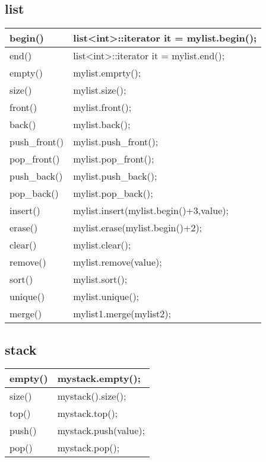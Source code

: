 \documentclass{article}
\begin{document}
	\subsection{list}
	\begin{table}[h]
		\centering
		\begin{tabular}{|p{3cm}|p{10cm}|}
			\hline
			begin() & list<int>::iterator it = mylist.begin();\\
			\hline
			end() &  list<int>::iterator it = mylist.end(); \\
			\hline
			empty() & mylist.emprty(); \\
			\hline
			size() & mylist.size(); \\
			\hline
			front() & mylist.front();\\
			\hline
			back() & mylist.back();\\
			\hline
			push\_front() & mylist.push\_front();\\
			\hline
			pop\_front() & mylist.pop\_front();\\
			\hline
			push\_back() & mylist.push\_back();\\
			\hline
			pop\_back() & mylist.pop\_back();\\
			\hline
			insert() & mylist.insert(mylist.begin()+3,value);\\
			\hline
			erase() & mylist.erase(mylist.begin()+2);\\
			\hline
			clear() & mylist.clear();\\
			\hline
			remove() & mylist.remove(value);\\
			\hline
			sort() & mylist.sort();\\
			\hline
			unique() & mylist.unique();\\
			\hline
			merge() & mylist1.merge(mylist2);\\
			\hline
		\end{tabular}
	\end{table}
\newpage
	\subsection{stack}
	\begin{table}[h]
		\centering
		\begin{tabular}{|p{3cm}|p{10cm}|}
			\hline
			empty() & mystack.empty();\\
			\hline
			size() & mystack().size();\\
			\hline
			top() & mystack.top();\\
			\hline
			push() & mystack.push(value);\\
			\hline	
			pop() & mystack.pop();\\
			\hline
		\end{tabular}
	\end{table}
\end{document}
